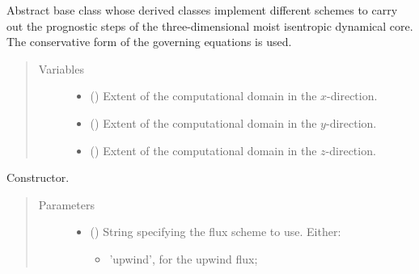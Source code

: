 \documentclass[letterpaper,10pt,english]{sphinxmanual}
\begin{document}
\begin{fulllineitems}
\label{\detokenize{api:dycore.prognostic_isentropic.PrognosticIsentropic}}
Abstract base class whose derived classes implement different schemes to carry out the prognostic steps of
the three-dimensional moist isentropic dynamical core. The conservative form of the governing equations is used.
\begin{quote}\begin{description}
\item[{Variables}] \leavevmode\begin{itemize}
\item {} 
 () \textendash{} Extent of the computational domain in the \(x\)-direction.

\item {} 
 () \textendash{} Extent of the computational domain in the \(y\)-direction.

\item {} 
 () \textendash{} Extent of the computational domain in the \(z\)-direction.

\end{itemize}

\end{description}\end{quote}

\begin{fulllineitems}
\label{\detokenize{api:dycore.prognostic_isentropic.PrognosticIsentropic.__init__}}
Constructor.
\begin{quote}\begin{description}
\item[{Parameters}] \leavevmode\begin{itemize}
\item {} 
 () \textendash{} 
String specifying the flux scheme to use. Either:
\begin{itemize}
\item {} 
’upwind’, for the upwind flux;


\end{itemize}
\end{itemize}
\end{description}
\end{quote}
\end{fulllineitems}
\end{fulllineitems}
\end{document}
